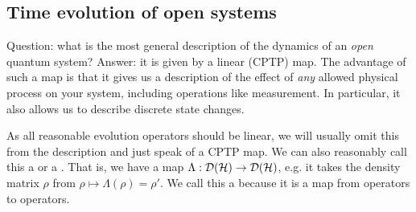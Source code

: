 \subsection*{Time evolution of open systems}
Question: what is the most general description of the dynamics of an \emph{open} quantum system? Answer: it is given by a linear  (CPTP) map. The advantage of such a map is that it gives us a description of the effect of \emph{any} allowed physical process on your system, including operations like measurement. In particular, it also allows us to describe discrete state changes.

As all reasonable evolution operators should be linear, we will usually omit this from the description and just speak of a CPTP map. We can also reasonably call this a  or a . That is, we have a map $\Lambda:\mathcal{D}(\mathcal H)\to \mathcal{D}(\mathcal H)$, e.g. it takes the density matrix $\rho$ from $\rho\mapsto \Lambda(\rho)=\rho'$. We call this a  because it is a map from operators to operators.

